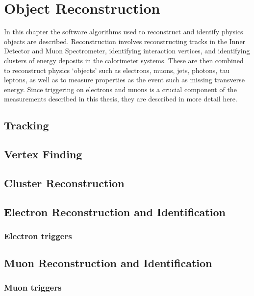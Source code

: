 \graphicspath{{Figures/}}

\chapter{Object Reconstruction}
\label{chap:Reconstruction}

In this chapter the software algorithms used to reconstruct and identify physics
objects are described. Reconstruction involves reconstructing tracks in the
Inner Detector and Muon Spectrometer, identifying interaction vertices,
and identifying clusters of energy deposits in the calorimeter systems. These are
then combined to reconstruct physics `objects' such as electrons, muons, jets, photons,
tau leptons, as well as to measure properties as the event such as missing
transverse energy. 
Since triggering on electrons and muons is a crucial component of the
measurements described in this thesis, they are described in more detail here.

\section{Tracking}
\label{sec:reco-tracking}


\section{Vertex Finding}
\label{sec:reco-vertexing}


\section{Cluster Reconstruction}
\label{sec:reco-clustering}

\section{Electron Reconstruction and Identification}
\label{sec:reco-el}

\subsection{Electron triggers}
\label{sec:reco-el-triggers}

\section{Muon Reconstruction and Identification}
\label{sec:reco-mu}

\subsection{Muon triggers}
\label{sec:reco-mu-triggers}
